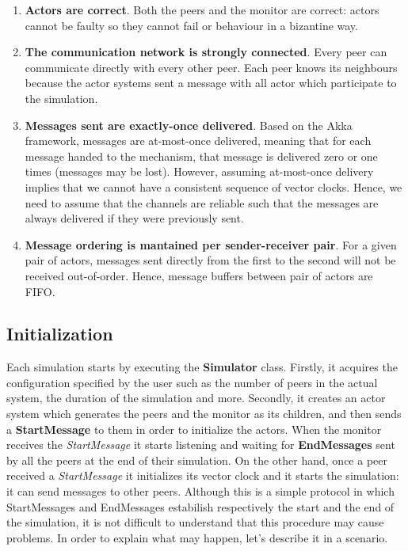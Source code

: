 \documentclass[11pt]{article}
\begin{document}
\begin{enumerate}
\item \textbf{Actors are correct}. Both the peers and the monitor are correct: actors cannot be faulty so they cannot fail or behaviour in a bizantine way.
\item \textbf{The communication network is strongly connected}. Every peer can communicate directly with every other peer. Each peer knows its neighbours because the actor systems sent a message with all actor which participate to the simulation.
\item \textbf{Messages sent are exactly-once delivered}. Based on the Akka framework, messages are at-most-once delivered, meaning that for each message handed to the mechanism, that message is delivered zero or one times (messages may be lost). However, assuming at-most-once delivery implies that we cannot have a consistent sequence of vector clocks. Hence, we need to assume that the channels are reliable such that the messages are always delivered if they were previously sent.
\item \textbf{Message ordering is mantained per sender-receiver pair}. For a given pair of actors, messages sent directly from the first to the second will not be received out-of-order. Hence, message buffers between pair of actors are FIFO.
\end{enumerate}

\subsection{Initialization}

Each simulation starts by executing the \textbf{Simulator} class. Firstly, it acquires the configuration specified by the user such as the number of peers in the actual system, the duration of the simulation and more. Secondly, it creates an actor system which generates the peers and the monitor as its children, and then sends a \textbf{StartMessage} to them in order to initialize the actors. When the monitor receives the \textit{StartMessage} it starts listening and waiting for \textbf{EndMessages} sent by all the peers at the end of their simulation. On the other hand, once a peer received a \textit{StartMessage} it initializes its vector clock and it starts the simulation: it can send messages to other peers.
Although this is a simple protocol in which StartMessages and EndMessages estabilish respectively the start and the end of the simulation, it is not difficult to understand that this procedure may cause problems. In order to explain what may happen, let's describe it in a scenario.
\end{document}
